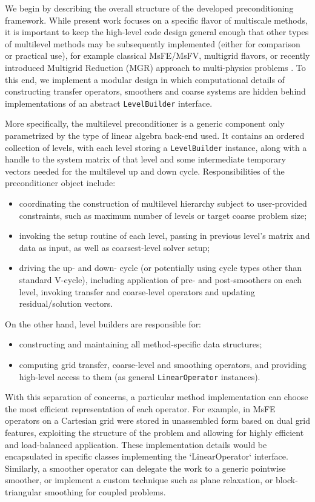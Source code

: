 We begin by describing the overall structure of the developed preconditioning framework.   While present work focuses on a specific flavor of multiscale methods, it is important to keep the high-level code design general enough that other types of multilevel methods may be subsequently implemented (either for comparison or practical use), for example classical MsFE/MsFV, multigrid flavors, or recently introduced Multigrid Reduction (MGR) approach to multi-physics problems \cite{Bui2020}.   To this end, we implement a modular design in which computational details of constructing transfer operators, smoothers and coarse systems are hidden behind implementations of an abstract \texttt{LevelBuilder} interface.

More specifically, the multilevel preconditioner is a generic component only parametrized by the type of linear algebra back-end used.   It contains an ordered collection of levels, with each level storing a \texttt{LevelBuilder} instance, along with a handle to the system matrix of that level and some intermediate temporary vectors needed for the multilevel up and down cycle.   Responsibilities of the preconditioner object include:
\begin{itemize}
    \item coordinating the construction of multilevel hierarchy subject to user-provided constraints, such as maximum number of levels or target coarse problem size;
    \item invoking the setup routine of each level, passing in previous level's matrix and data as input, as well as coarsest-level solver setup;
    \item driving the up- and down- cycle (or potentially using cycle types other than standard V-cycle), including application of pre- and post-smoothers on each level, invoking transfer and coarse-level operators and updating residual/solution vectors.
\end{itemize}
On the other hand, level builders are responsible for:
\begin{itemize}
    \item constructing and maintaining all method-specific data structures;
    \item computing grid transfer, coarse-level and smoothing operators, and providing high-level access to them (as general \texttt{LinearOperator} instances).
\end{itemize}
With this separation of concerns, a particular method implementation can choose the most efficient representation of each operator.   For example, in \cite{Manea2015,Manea2016} MsFE operators on a Cartesian grid were stored in unassembled form based on dual grid features, exploiting the structure of the problem and allowing for highly efficient and load-balanced application.   These implementation details would be encapsulated in specific classes implementing the `LinearOperator` interface.   Similarly, a smoother operator can delegate the work to a generic pointwise smoother, or implement a custom technique such as plane relaxation, or block-triangular smoothing for coupled problems.

